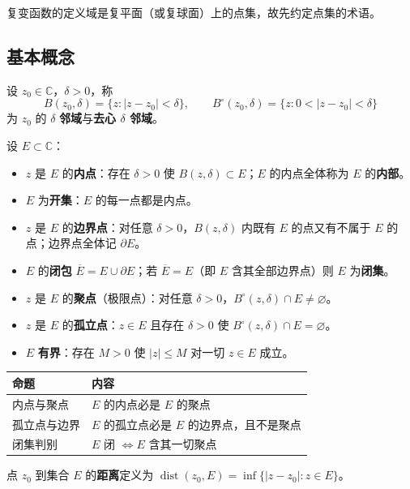 复变函数的定义域是复平面（或复球面）上的点集，故先约定点集的术语。

\subsection{基本概念}
设 \(z_{0}\in\mathbb{C}\)，\(\delta>0\)，称
\[
B(z_{0},\delta)=\{z: |z-z_{0}|<\delta\},\qquad
B^{\circ}(z_{0},\delta)=\{z: 0<|z-z_{0}|<\delta\}
\]
为 \(z_{0}\) 的 \(\delta\) \textbf{邻域}与\textbf{去心 \(\delta\) 邻域}。

设 \(E\subset\mathbb{C}\)：
\begin{itemize}[leftmargin=2em]
  \item \(z\) 是 \(E\) 的\textbf{内点}：存在 \(\delta>0\) 使 \(B(z,\delta)\subset E\)；\(E\) 的内点全体称为 \(E\) 的\textbf{内部}。
  \item \(E\) 为\textbf{开集}：\(E\) 的每一点都是内点。
  \item \(z\) 是 \(E\) 的\textbf{边界点}：对任意 \(\delta>0\)，\(B(z,\delta)\) 内既有 \(E\) 的点又有不属于 \(E\) 的点；边界点全体记 \(\partial E\)。
  \item \(E\) 的\textbf{闭包} \(\overline{E}=E\cup\partial E\)；若 \(\overline{E}=E\)（即 \(E\) 含其全部边界点）则 \(E\) 为\textbf{闭集}。
  \item \(z\) 是 \(E\) 的\textbf{聚点}（极限点）：对任意 \(\delta>0\)，\(B^{\circ}(z,\delta)\cap E\neq\varnothing\)。
  \item \(z\) 是 \(E\) 的\textbf{孤立点}：\(z\in E\) 且存在 \(\delta>0\) 使 \(B^{\circ}(z,\delta)\cap E=\varnothing\)。
  \item \(E\) \textbf{有界}：存在 \(M>0\) 使 \(|z|\leqslant M\) 对一切 \(z\in E\) 成立。
\end{itemize}

\begin{center}
\begin{tabular}{ll}
\toprule
命题 & 内容 \\
\midrule
内点与聚点 & \(E\) 的内点必是 \(E\) 的聚点 \\
孤立点与边界 & \(E\) 的孤立点必是 \(E\) 的边界点，且不是聚点 \\
闭集判别 & \(E\) 闭 \(\iff E\) 含其一切聚点 \\
\bottomrule
\end{tabular}
\end{center}

点 \(z_{0}\) 到集合 \(E\) 的\textbf{距离}定义为 \(\operatorname{dist}(z_{0},E)=\inf\{|z-z_{0}|: z\in E\}\)。

